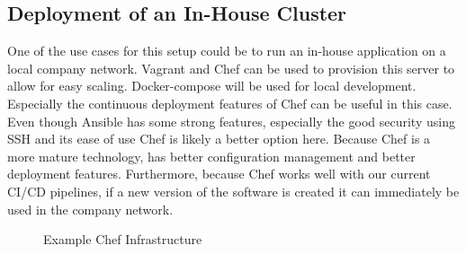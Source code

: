 \subsection{Deployment of an In-House Cluster}
One of the use cases for this setup could be to run an in-house application on a local company network. Vagrant and Chef can be used to provision this server to allow for easy scaling. Docker-compose will be used for local development. Especially the continuous deployment features of Chef can be useful in this case\cite{ansible-vs-chef2}. Even though Ansible has some strong features, especially the good security using SSH and its ease of use Chef is likely a better option here. Because Chef is a more mature technology\cite{ansible-vs-chef}, has better configuration management and better deployment features. Furthermore, because Chef works well with our current CI/CD pipelines, if a new version of the software is created it can immediately be used in the company network. 

\begin{figure}
    \centering
    \caption{Example Chef Infrastructure}
    \label{fig:chef-infrastructure}
\end{figure}

